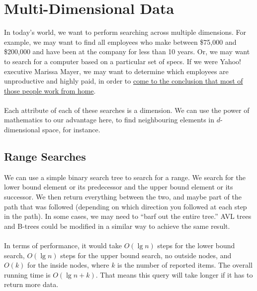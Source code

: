 \documentclass[]{article}
\theoremstyle{definition}
\begin{document}
	\section{Multi-Dimensional Data}
		In today's world, we want to perform searching across multiple dimensions. For example, we may want to find all employees who make between \$75,000 and \$200,000 and have been at the company for less than 10 years. Or, we may want to search for a computer based on a particular set of specs. If we were Yahoo! executive Marissa Mayer, we may want to determine which employees are unproductive and highly paid, in order to \href{http://allthingsd.com/20130222/physically-together-heres-the-internal-yahoo-no-work-from-home-memo-which-extends-beyond-remote-workers/}{come to the conclusion that most of those people work from home}.
		\\ \\
		Each attribute of each of these searches is a dimension. We can use the power of mathematics to our advantage here, to find neighbouring elements in $d$-dimensional space, for instance.

		\subsection{Range Searches}
			We can use a simple binary search tree to search for a range. We search for the lower bound element or its predecessor and the upper bound element or its successor. We then return everything between the two, and maybe part of the path that was followed (depending on which direction you followed at each step in the path). In some cases, we may need to ``barf out the entire tree.'' AVL trees and B-trees could be modified in a similar way to achieve the same result.
			\\ \\
			In terms of performance, it would take $O(\lg n)$ steps for the lower bound search, $O(\lg n)$ steps for the upper bound search, no outside nodes, and $O(k)$ for the inside nodes, where $k$ is the number of reported items. The overall running time is $O(\lg n + k)$. That means this query will take longer if it has to return more data.
\end{document}
